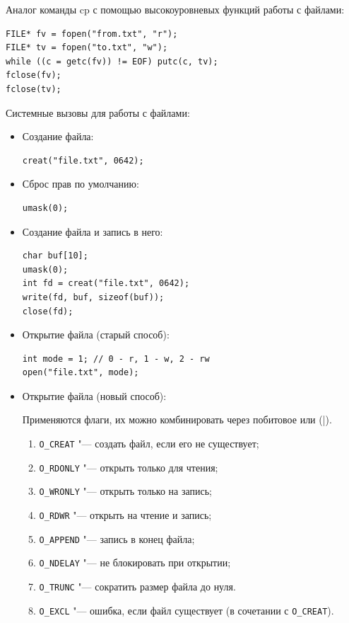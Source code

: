 Аналог команды cp с помощью высокоуровневых функций работы с файлами:

\begin{verbatim}
FILE* fv = fopen("from.txt", "r");
FILE* tv = fopen("to.txt", "w");
while ((c = getc(fv)) != EOF) putc(c, tv);
fclose(fv);
fclose(tv);
\end{verbatim}

Системные вызовы для работы с файлами:

\begin{itemize}
\item Создание файла:
\begin{verbatim}
creat("file.txt", 0642);
\end{verbatim}

\item Сброс прав по умолчанию:
\begin{verbatim}
umask(0);
\end{verbatim}

\item Создание файла и запись в него:
\begin{verbatim}
char buf[10];
umask(0);
int fd = creat("file.txt", 0642);
write(fd, buf, sizeof(buf));
close(fd);
\end{verbatim}

\item Открытие файла (старый способ):
\begin{verbatim}
int mode = 1; // 0 - r, 1 - w, 2 - rw
open("file.txt", mode);
\end{verbatim}

\item Открытие файла (новый способ):

Применяются флаги, их можно комбинировать через побитовое или (|).
\begin{enumerate}
    \item \texttt{O\_CREAT} "--- создать файл, если его не существует;
    \item \texttt{O\_RDONLY} "--- открыть только для чтения;
    \item \texttt{O\_WRONLY} "--- открыть только на запись;
    \item \texttt{O\_RDWR} "--- открыть на чтение и запись;
    \item \texttt{O\_APPEND} "--- запись в конец файла;
    \item \texttt{O\_NDELAY} "--- не блокировать при открытии;
    \item \texttt{O\_TRUNC} "--- сократить размер файла до нуля.
    \item \texttt{O\_EXCL} "--- ошибка, если файл существует (в сочетании с \texttt{O\_CREAT}).
\end{enumerate}


\end{itemize}
